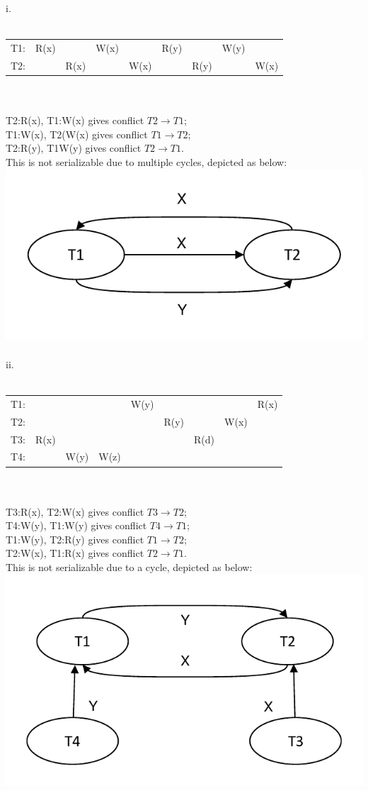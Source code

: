 \documentclass[a4paper]{article}
\begin{document}
i.\\\\
\begin{tabular}{lllllllll}
T1: & R(x) &      & W(x) &      & R(y) &      & W(y) &      \\ 
T2: &      & R(x) &      & W(x) &      & R(y) &      & W(x)
\end{tabular}%
\\\\
T2:R(x), T1:W(x) gives conflict $T2 \rightarrow T1$;\\
T1:W(x), T2(W(x) gives conflict $T1 \rightarrow T2$;\\
T2:R(y), T1W(y) gives conflict $T2 \rightarrow T1$.\\
This is not serializable due to multiple cycles, depicted as below:
\\ 
\includegraphics[scale=1]{fig1.pdf}
\\\\ii.\\\\
\begin{tabular}{lllllllll}
T1: &      &      &     & W(y) &      &      &      & R(x) \\ 
T2: &      &      &     &      & R(y) &      & W(x) &      \\ 
T3: & R(x) &    &       &      &      & R(d) &      &      \\ 
T4: &      & W(y) & W(z) &      &      &      &      &     
\end{tabular}
\\\\
T3:R(x), T2:W(x) gives conflict $T3 \rightarrow T2$;\\
T4:W(y), T1:W(y) gives conflict $T4\rightarrow T1$;\\
T1:W(y), T2:R(y) gives conflict $T1\rightarrow T2$;\\
T2:W(x), T1:R(x) gives conflict $T2\rightarrow T1$.\\
This is not serializable due to a cycle, depicted as below:\\ 
\includegraphics[scale=1]{fig2.pdf}
\end{document}
